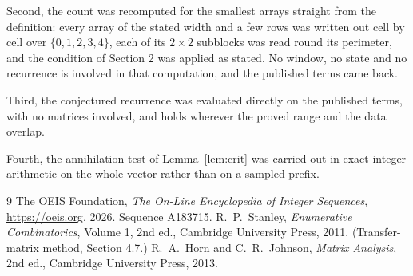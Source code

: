 \documentclass[11pt,a4paper]{article}
\theoremstyle{plain}
\theoremstyle{definition}
\begin{document}
Second, the count was recomputed for the smallest arrays straight from the definition: every
array of the stated width and a few rows was written out cell by cell over $\{0,1,2,3,4\}$, each of
its $2\times2$ subblocks was read round its perimeter, and the condition of Section 2 was
applied as stated. No window, no state and no recurrence is involved in that computation, and
the published terms came back.

Third, the conjectured recurrence was evaluated directly on the published terms, with no
matrices involved, and holds wherever the proved range and the data overlap.

Fourth, the annihilation test of Lemma~\ref{lem:crit} was carried out in exact integer
arithmetic on the whole vector rather than on a sampled prefix.

\begin{thebibliography}{9}
 The OEIS Foundation, \emph{The On-Line Encyclopedia of Integer
Sequences}, \url{https://oeis.org}, 2026. Sequence A183715.
 R.~P.~Stanley, \emph{Enumerative Combinatorics}, Volume 1, 2nd ed.,
Cambridge University Press, 2011. (Transfer-matrix method, Section 4.7.)
 R.~A.~Horn and C.~R.~Johnson, \emph{Matrix Analysis}, 2nd ed., Cambridge
University Press, 2013.
\end{thebibliography}
\end{document}
